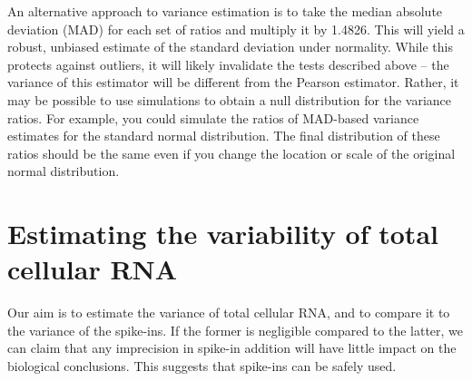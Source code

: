 \documentclass{article}
\begin{document}
An alternative approach to variance estimation is to take the median absolute deviation (MAD) for each set of ratios and multiply it by 1.4826.
This will yield a robust, unbiased estimate of the standard deviation under normality.
While this protects against outliers, it will likely invalidate the tests described above -- the variance of this estimator will be different from the Pearson estimator.
Rather, it may be possible to use simulations to obtain a null distribution for the variance ratios.
For example, you could simulate the ratios of MAD-based variance estimates for the standard normal distribution.
The final distribution of these ratios should be the same even if you change the location or scale of the original normal distribution.

\newpage
\section{Estimating the variability of total cellular RNA}
Our aim is to estimate the variance of total cellular RNA, and to compare it to the variance of the spike-ins.
If the former is negligible compared to the latter, we can claim that any imprecision in spike-in addition will have little impact on the biological conclusions.
This suggests that spike-ins can be safely used.
\end{document}
